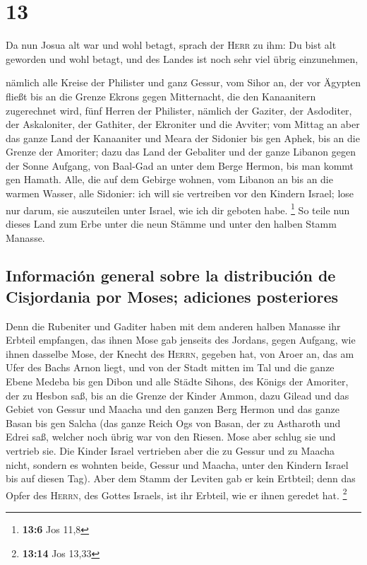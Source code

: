 \hypertarget{section-12}{%
\section{13}\label{section-12}}

 Da nun Josua alt war und wohl betagt, sprach der
\textsc{Herr} zu ihm: Du bist alt geworden und wohl betagt, und des
Landes ist noch sehr viel übrig einzunehmen,

 nämlich alle Kreise der Philister und ganz Gessur,
 vom Sihor an, der vor Ägypten fließt bis an die Grenze
Ekrons gegen Mitternacht, die den Kanaanitern zugerechnet wird, fünf
Herren der Philister, nämlich der Gaziter, der Asdoditer, der
Askaloniter, der Gathiter, der Ekroniter und die Avviter; 
vom Mittag an aber das ganze Land der Kanaaniter und Meara der Sidonier
bis gen Aphek, bis an die Grenze der Amoriter;  dazu das
Land der Gebaliter und der ganze Libanon gegen der Sonne Aufgang, von
Baal-Gad an unter dem Berge Hermon, bis man kommt gen Hamath.
 Alle, die auf dem Gebirge wohnen, vom Libanon an bis an
die warmen Wasser, alle Sidonier: ich will sie vertreiben vor den
Kindern Israel; lose nur darum, sie auszuteilen unter Israel, wie ich
dir geboten habe. \footnote{\textbf{13:6} Jos 11,8}  So
teile nun dieses Land zum Erbe unter die neun Stämme und unter den
halben Stamm Manasse.

\hypertarget{informaciuxf3n-general-sobre-la-distribuciuxf3n-de-cisjordania-por-moses-adiciones-posteriores}{%
\subsection{Información general sobre la distribución de Cisjordania por
Moses; adiciones
posteriores}\label{informaciuxf3n-general-sobre-la-distribuciuxf3n-de-cisjordania-por-moses-adiciones-posteriores}}

 Denn die Rubeniter und Gaditer haben mit dem anderen
halben Manasse ihr Erbteil empfangen, das ihnen Mose gab jenseits des
Jordans, gegen Aufgang, wie ihnen dasselbe Mose, der Knecht des
\textsc{Herrn}, gegeben hat,  von Aroer an, das am Ufer
des Bachs Arnon liegt, und von der Stadt mitten im Tal und die ganze
Ebene Medeba bis gen Dibon  und alle Städte Sihons, des
Königs der Amoriter, der zu Hesbon saß, bis an die Grenze der Kinder
Ammon,  dazu Gilead und das Gebiet von Gessur und Maacha
und den ganzen Berg Hermon und das ganze Basan bis gen Salcha
 (das ganze Reich Ogs von Basan, der zu Astharoth und
Edrei saß, welcher noch übrig war von den Riesen. Mose aber schlug sie
und vertrieb sie.  Die Kinder Israel vertrieben aber die
zu Gessur und zu Maacha nicht, sondern es wohnten beide, Gessur und
Maacha, unter den Kindern Israel bis auf diesen Tag). 
Aber dem Stamm der Leviten gab er kein Ertbteil; denn das Opfer des
\textsc{Herrn}, des Gottes Israels, ist ihr Erbteil, wie er ihnen
geredet hat. \footnote{\textbf{13:14} Jos 13,33}

